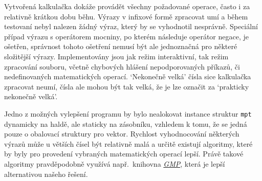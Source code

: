 Vytvořená kalkulačka dokáže provádět všechny požadované operace, často i za relativně krátkou dobu běhu. Výrazy v infixové formě zpracovat umí a během testovaní nebyl nalezen žádný výraz, který by se vyhodnotil nesprávně. Speciální případ výrazu s operátorem mocniny, po kterém následuje operátor negace, je ošetřen, správnost tohoto ošetření nemusí být ale jednoznačná pro některé složitější výrazy. Implementovány jsou jak režim interaktivní, tak režim zpracování souboru, včetně chybových hlášení nepodporovaných příkazů, či nedefinovaných matematických operací. `Nekonečně velká' čísla sice kalkulačka zpracovat neumí, čísla ale mohou být tak velká, že je lze označit za `prakticky nekonečně velká'.

Jedno z možných vylepšení programu by bylo nealokovat instance struktur \verb|mpt| dynamicky na haldě, ale staticky na zásobníku, vzhledem k tomu, že se jedná pouze o obalovací struktury pro vektor. 
Rychlost vyhodnocování některých výrazů může u větších čísel být relativně malá a určitě existují algoritmy, které by byly pro provedení vybraných matematických operací lepší. Právě takové algoritmy pravděpodobně využívá např.~knihovna \href{https://gmplib.org/}{\textit{GMP}}, která je lepší alternativou našeho řešení.